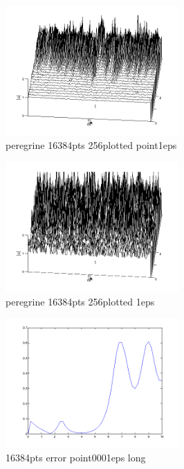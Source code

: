 \documentclass{beamer}
\theoremstyle{plain}
\theoremstyle{definition}
\begin{document}
\frame
{
\begin{figure}
\begin{center}
\includegraphics[width=250px]{peregrine_16384pts_256plotted_point1eps.png}\\
peregrine 16384pts 256plotted point1eps
\end{center}
\end{figure}
}

\frame
{
\begin{figure}
\begin{center}
\includegraphics[width=250px]{peregrine_16384pts_256plotted_1eps.png}\\
peregrine 16384pts 256plotted 1eps
\end{center}
\end{figure}
}


\frame
{
\begin{figure}
\begin{center}
\includegraphics[width=250px]{16384pts_error_point0001eps_long.png}\\
16384pts error point0001eps long
\end{center}
\end{figure}
}
\end{document}
